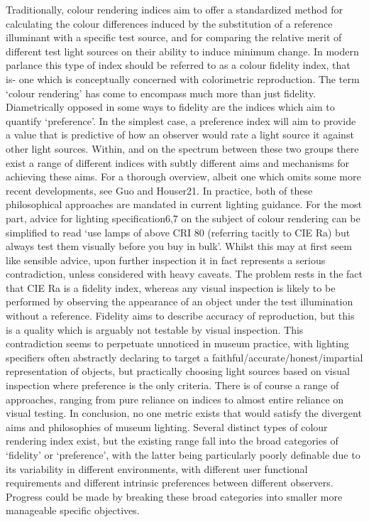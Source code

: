 Traditionally, colour rendering indices aim to offer a standardized method for calculating the colour differences induced by the substitution of a reference illuminant with a specific test source, and for comparing the relative merit of different test light sources on their ability to induce minimum change. In modern parlance this type of index should be referred to as a colour fidelity index, that is- one which is conceptually concerned with colorimetric reproduction. The term `colour rendering' has come to encompass much more than just fidelity.
Diametrically opposed in some ways to fidelity are the indices which aim to quantify `preference'. In the simplest case, a preference index will aim to provide a value that is predictive of how an observer would rate a light source it against other light sources. 
Within, and on the spectrum between these two groups there exist a range of different indices with subtly different aims and mechanisms for achieving these aims. For a thorough overview, albeit one which omits some more recent developments, see Guo and Houser21.
In practice, both of these philosophical approaches are mandated in current lighting guidance. For the most part, advice for lighting specification6,7 on the subject of colour rendering can be simplified to read `use lamps of above CRI 80 (referring tacitly to CIE Ra) but always test them visually before you buy in bulk'. Whilst this may at first seem like sensible advice, upon further inspection it in fact represents a serious contradiction, unless considered with heavy caveats. The problem rests in the fact that CIE Ra is a fidelity index, whereas any visual inspection is likely to be performed by observing the appearance of an object under the test illumination without a reference. Fidelity aims to describe accuracy of reproduction, but this is a quality which is arguably not testable by visual inspection. This contradiction seems to perpetuate unnoticed in museum practice, with lighting specifiers often abstractly declaring to target a faithful/accurate/honest/impartial representation of objects, but practically choosing light sources based on visual inspection where preference is the only criteria. There is of course a range of approaches, ranging from pure reliance on indices to almost entire reliance on visual testing.
In conclusion, no one metric exists that would satisfy the divergent aims and philosophies of museum lighting. Several distinct types of colour rendering index exist, but the existing range fall into the broad categories of `fidelity' or `preference', with the latter being particularly poorly definable due to its variability in different environments, with different user functional requirements and different intrinsic preferences between different observers. Progress could be made by breaking these broad categories into smaller more manageable specific objectives.

